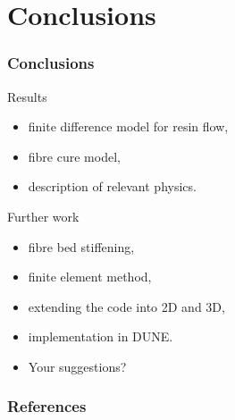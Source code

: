 \documentclass[compress]{beamer}%
\newcommand{\eqcolor}{blue}
\newenvironment{myalign}
{\align\color{\eqcolor}}
{
  \nonumber
  \endalign
  \vspace{-1em}
}
\begin{document}
\section{Conclusions}

\begin{frame}
  \frametitle{Conclusions}
  Results
  \begin{itemize}
  \item finite difference model for resin flow,
  \item fibre cure model,
  \item description of relevant physics.
  \end{itemize}

  Further work
  \begin{itemize}
  \item fibre bed stiffening,
  \item finite element method,
  \item extending the code into 2D and 3D,
  \item implementation in DUNE.
  \item Your suggestions?
  \end{itemize}
\end{frame}


  
  


\begin{frame}
  \frametitle{References}
  
\end{frame}
\end{document}
